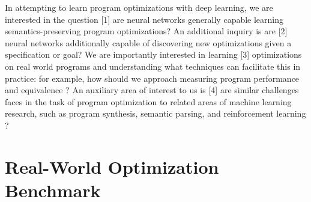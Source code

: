 \documentclass{article}
\begin{document}

In attempting to learn program optimizations with deep learning, we are interested in the question [1] are neural networks generally capable learning semantics-preserving program optimizations? An additional inquiry is are [2] neural networks additionally capable of discovering new optimizations given a specification or goal? We are importantly interested in learning [3] optimizations on real world programs and understanding what techniques can facilitate this in practice: for example, how should we approach measuring program performance and equivalence ? An auxiliary area of interest to us is [4] are similar challenges faces in the task of program optimization to related areas of machine learning research, such as program synthesis, semantic parsing, and reinforcement learning ?  


\section{Real-World Optimization Benchmark}
\label{sec:benchmark}





\end{document}
